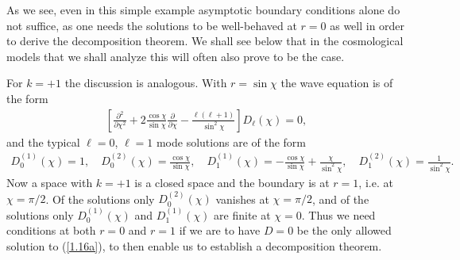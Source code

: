 \documentclass[aps,onecolumn,10pt]{revtex4}
\numberwithin{equation}{section}
\numberwithin{equation}{section}
\begin{document}
As we see, even in this simple example asymptotic boundary conditions alone do not suffice, as one needs the solutions to be well-behaved at $r=0$ as well in order to derive the decomposition theorem. We shall see below that in the cosmological models that we shall analyze this will often also prove to be the case. 


For $k=+1$ the discussion is analogous. With $r=\sin\chi$ the wave equation is of the form
%
\begin{align}
\left[\frac{\partial^2}{\partial \chi^2}+2\frac{\cos\chi}{\sin\chi}\frac{\partial}{\partial \chi}-\frac{\ell(\ell+1)}{\sin^2\chi}\right]D_{\ell}(\chi)=0,
\label{1.19a}
\end{align}
%
and the typical $\ell=0$, $\ell=1$ mode solutions are of the form
%
\begin{align}
D^{(1)}_{0}(\chi)=1,\quad D^{(2)}_{0}(\chi)=\frac{\cos\chi}{\sin\chi},\quad D^{(1)}_{1}(\chi)=-\frac{\cos\chi}{\sin\chi}+\frac{\chi}{\sin^2\chi},\quad D^{(2)}_{1}(\chi)=\frac{1}{\sin^2\chi}.
\label{1.20a}
\end{align}
% 
Now a space with $k=+1$ is a closed space and the boundary is at $r=1$, i.e. at $\chi=\pi/2$. Of the solutions only $D^{(2)}_{0}(\chi)$ vanishes at $\chi=\pi/2$, and of the solutions only $D^{(1)}_{0}(\chi)$ and $D^{(1)}_{1}(\chi)$ are finite at $\chi=0$. Thus  we need conditions at both $r=0$ and $r=1$ if we are to have $D=0$ be the only allowed solution to (\ref{1.16a}), to then enable us to establish a decomposition theorem.
\end{document}
